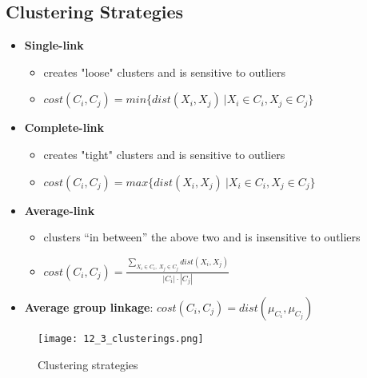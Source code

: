 \documentclass{article}
\begin{document}
\subsection{Clustering Strategies}
\begin{itemize}
    \item \textbf{Single-link}
        \begin{itemize}
            \item creates "loose" clusters and is sensitive to outliers
            \item $cost(C_i,C_j) = min\{dist(X_i,X_j) \ | X_i \in C_i, X_j \in C_j\}$
        \end{itemize}
    \item \textbf{Complete-link}
        \begin{itemize}
            \item creates "tight" clusters and is sensitive to outliers
            \item $cost(C_i,C_j) = max\{dist(X_i,X_j) \ | X_i \in C_i, X_j \in C_j\}$
        \end{itemize}
    \item \textbf{Average-link}
        \begin{itemize}
            \item clusters “in between” the above two and is insensitive to outliers
            \item $cost(C_i,C_j) = \displaystyle\frac{\sum_{X_i \in C_i, \ X_j \in C_j} dist(X_i,X_j)}{|C_i| \cdot |C_j|}$
        \end{itemize}
    \item \textbf{Average group linkage}: $cost(C_i, C_j) = dist(\mu_{C_i}, \mu_{C_j})$
\end{itemize}
\begin{figure}[H]
    \centering
    \texttt{[image: 12\_3\_clusterings.png]}
    \caption{Clustering strategies}
\end{figure}
\end{document}
